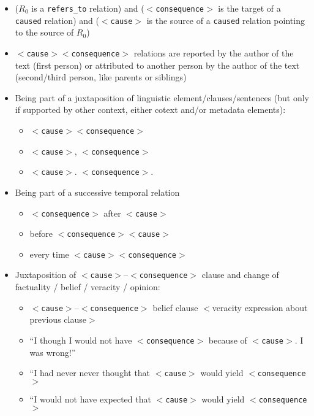 \documentclass[12pt]{article}
\theoremstyle{definition}
\newcommand{\cause}{$<$\texttt{cause}$>$\xspace}
\newcommand{\conseq}{$<$\texttt{consequence}$>$\xspace}
\begin{document}
\begin{itemize}
\begin{itemize}
        \item \cause is correlated with \conseq and \cause is preceding \conseq
        \item \cause is probably linked with \conseq and \cause is preceding \conseq
    \end{itemize}
    \item ($R_0$ is a \texttt{refers\_to} relation) and (\conseq is the target of a \texttt{caused} relation) and (\cause is the source of a \texttt{caused} relation pointing  to the source of $R_0$) 
    \item \cause \conseq relations are reported by the author of the text (first person) or attributed to another person by the author of the text (second/third person, like parents or siblings)
    \item Being part of a juxtaposition of linguistic element/clauses/sentences (but only if supported by other context, either cotext and/or metadata elements):
    \begin{itemize}
        \item \cause \conseq
        \item \cause, \conseq
        \item \cause. \conseq.
    \end{itemize}
    \item Being part of a successive temporal relation
    \begin{itemize}
        \item \conseq after \cause
        \item before \conseq \cause
        \item every time \cause \conseq
    \end{itemize}
    \item Juxtaposition of \cause--\conseq clause and change of factuality / belief / veracity / opinion:
    \begin{itemize}
        \item \cause--\conseq belief clause  $<$veracity expression about previous clause$>$
        \item ``I though I would not have \conseq because of \cause. I was wrong!''
        \item ``I had never never thought that \cause would yield \conseq
        \item ``I would not have expected that \cause would yield \conseq
    \end{itemize}


 
\end{itemize}
\end{document}

